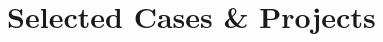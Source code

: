 \documentclass{article}
\begin{document}






%


\section{\faFileAlt\ Selected Cases \& Projects}




\clearpage
\end{document}
